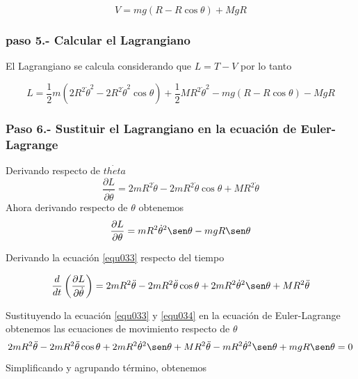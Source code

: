 \documentclass[12pt]{book}
\theoremstyle{definition}
\theoremstyle{remark}
\theoremstyle{plain}
\begin{document}
\begin{equation}
\label{equ030}
V = m g (R- R \cos \theta)+ M g R
\end{equation}

\subsubsection{paso 5.- Calcular el Lagrangiano}

El Lagrangiano se calcula considerando que $L=T-V$ por lo tanto

\begin{equation}
\label{equ031}
L =  \frac{1}{2} m (2  R^2 \dot{\theta}^2- 2 R^2 \dot{\theta}^2 \cos \theta )+\frac{1}{2} M R ^2 \dot{\theta}^2 - m g (R- R \cos \theta) -  M g R
\end{equation}

\subsubsection{Paso 6.- Sustituir el Lagrangiano en la ecuación de Euler-Lagrange}

Derivando respecto de $\dot{theta}$
\begin{equation}
\label{equ032}
\frac{\partial L}{\partial \dot{\theta}}= 2 m R^2 \dot{\theta}-2 m R^2 \dot{\theta} \cos \theta+ M R^2 \dot{\theta} 
\end{equation}
Ahora derivando respecto de $\theta$ obtenemos
\begin{equation}
\label{equ033}
\frac{\partial L}{\partial \theta}= m R^2 \dot{\theta}^2 \sen \theta- m g R \sen \theta 
\end{equation}


Derivando la ecuación \ref{equ033} respecto del tiempo

\begin{equation}
\label{equ034}
\frac{d}{d t} \left ( \frac{\partial L}{\partial \dot{\theta}}\right )= 2 m R^2 \ddot{\theta}-2 m R^2 \ddot{\theta} \cos \theta+2 m R^2 \dot{\theta}^2 \sen \theta+ M R^2 \ddot{\theta} 
\end{equation}
 
Sustituyendo la ecuación \ref{equ033} y \ref{equ034} en la ecuación de Euler-Lagrange obtenemos las ecuaciones de movimiento respecto de $\theta$
\begin{equation*}
2 m R^2 \ddot{\theta}-2 m R^2 \ddot{\theta} \cos \theta+2 m R^2 \dot{\theta}^2 \sen \theta+ M R^2 \ddot{\theta}-m R^2 \dot{\theta}^2 \sen \theta+ m g R \sen \theta =0
\end{equation*}
Simplificando y agrupando término,  obtenemos
\end{document}
